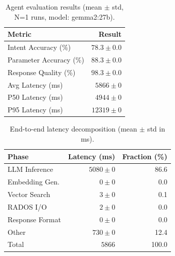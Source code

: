 
\begin{table}[t]
\centering
\caption{Agent evaluation results (mean $\pm$ std, N=1 runs, model: gemma2:27b).}
\label{tab:eval-results}
\begin{tabular}{lr}
\toprule
\textbf{Metric} & \textbf{Result} \\
\midrule
Intent Accuracy (\%) & $78.3 \pm 0.0$ \\
Parameter Accuracy (\%) & $88.3 \pm 0.0$ \\
Response Quality (\%) & $98.3 \pm 0.0$ \\
\midrule
Avg Latency (ms) & $5866 \pm 0$ \\
P50 Latency (ms) & $4944 \pm 0$ \\
P95 Latency (ms) & $12319 \pm 0$ \\
\bottomrule
\end{tabular}
\end{table}


\begin{table}[t]
\centering
\caption{End-to-end latency decomposition (mean $\pm$ std in ms).}
\label{tab:latency-decomp}
\begin{tabular}{lrr}
\toprule
\textbf{Phase} & \textbf{Latency (ms)} & \textbf{Fraction (\%)} \\
\midrule
LLM Inference & $5080 \pm 0$ & 86.6 \\
Embedding Gen. & $0 \pm 0$ & 0.0 \\
Vector Search & $3 \pm 0$ & 0.1 \\
RADOS I/O & $2 \pm 0$ & 0.0 \\
Response Format & $0 \pm 0$ & 0.0 \\
Other & $730 \pm 0$ & 12.4 \\
\midrule
Total & $5866$ & 100.0 \\
\bottomrule
\end{tabular}
\end{table}
